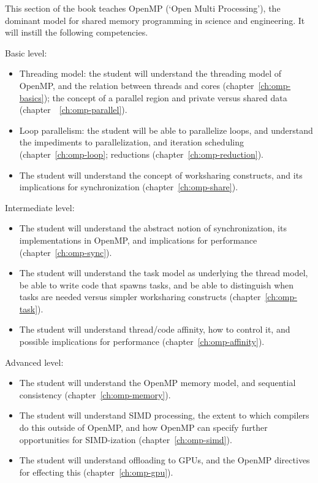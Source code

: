 
This section of the book teaches OpenMP (`Open Multi Processing'),
the dominant model for shared memory programming in science and engineering.
It will instill the following competencies.

Basic level:
\begin{itemize}
\item Threading model: the student will understand the threading model of OpenMP,
  and the relation between threads and cores (chapter~\ref{ch:omp-basics});
  the concept of a parallel region and private versus shared data
  (chapter~~\ref{ch:omp-parallel}).
\item Loop parallelism: the student will be able to parallelize loops,
  and understand the impediments to parallelization, and
  iteration scheduling (chapter~\ref{ch:omp-loop};
  reductions (chapter~\ref{ch:omp-reduction}).
\item The student will understand the concept of worksharing constructs,
  and its implications for synchronization (chapter~\ref{ch:omp-share}).
\end{itemize}

Intermediate level:
\begin{itemize}
\item The student will understand the abstract notion of synchronization,
  its implementations in OpenMP, and implications for performance
  (chapter~\ref{ch:omp-sync}).
\item The student will understand the task model as underlying the thread model,
  be able to write code that spawns tasks, and be able to distinguish
  when tasks are needed versus simpler worksharing constructs
  (chapter~\ref{ch:omp-task}).
\item The student will understand thread/code affinity, how to control it,
  and possible implications for performance (chapter~\ref{ch:omp-affinity}).
\end{itemize}

Advanced level:
\begin{itemize}
\item The student will understand the OpenMP memory model,
  and sequential consistency (chapter~\ref{ch:omp-memory}).
\item The student will understand \acs{SIMD} processing, the extent to which
  compilers do this outside of OpenMP,
  and how OpenMP can specify further opportunities for SIMD-ization
  (chapter~\ref{ch:omp-simd}).
\item The student will understand offloading to \acp{GPU},
  and the OpenMP directives for effecting this (chapter~\ref{ch:omp-gpu}).
\end{itemize}
